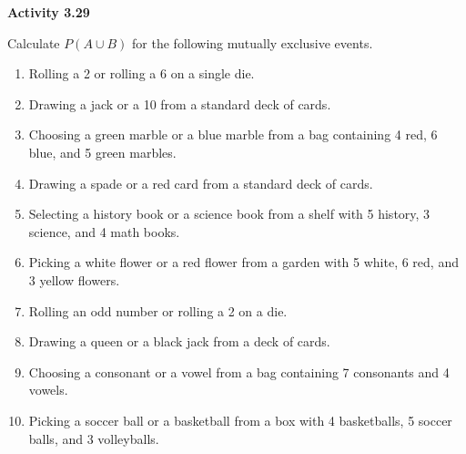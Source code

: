 \vspace{0.3ex}
\noindent\textbf{Activity 3.29}

\vspace{0.2ex}

Calculate \( P(A \cup B) \) for the following mutually exclusive events.

\begin{enumerate}[label=\color{blue}\arabic*.]
    \item Rolling a 2 or rolling a 6 on a single die.
    \item Drawing a jack or a 10 from a standard deck of cards.
    \item Choosing a green marble or a blue marble from a bag containing 4 red, 6 blue, and 5 green marbles.
    \item Drawing a spade or a red card from a standard deck of cards.
    \item Selecting a history book or a science book from a shelf with 5 history, 3 science, and 4 math books.
    \item Picking a white flower or a red flower from a garden with 5 white, 6 red, and 3 yellow flowers.
    \item Rolling an odd number or rolling a 2 on a die.
    \item Drawing a queen or a black jack from a deck of cards.
    \item Choosing a consonant or a vowel from a bag containing 7 consonants and 4 vowels.
    \item Picking a soccer ball or a basketball from a box with 4 basketballs, 5 soccer balls, and 3 volleyballs.
\end{enumerate}
